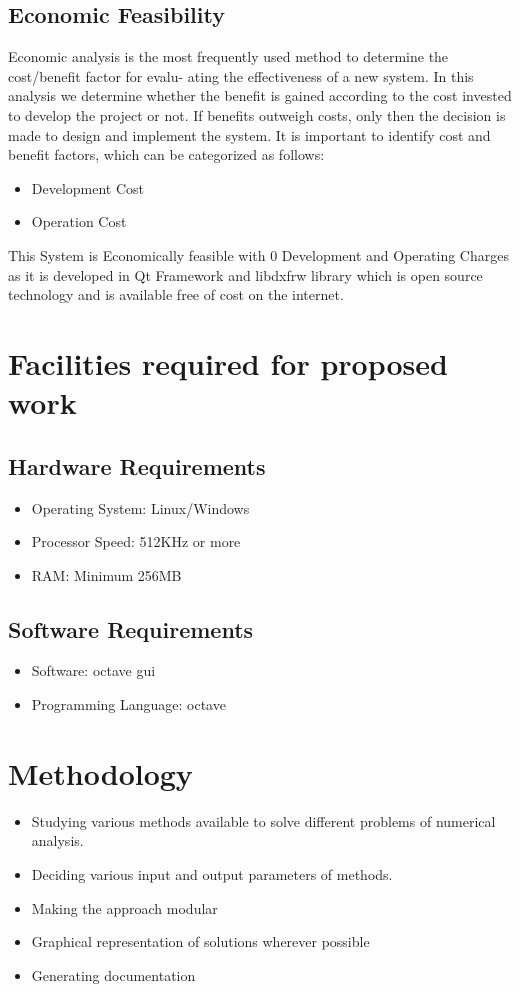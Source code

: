 \subsection{Economic Feasibility}
\noindent Economic analysis is the most frequently used method to determine the cost/benefit factor for evalu-
ating the effectiveness of a new system. In this analysis we determine whether the benefit is gained
according to the cost invested to develop the project or not. If benefits outweigh costs, only then
the decision is made to design and implement the system. It is important to identify cost and benefit
factors, which can be categorized as follows:
\begin{itemize}
\item Development Cost
\item Operation Cost
\end{itemize}
This System is Economically feasible with 0 Development and Operating Charges
as it is developed in Qt Framework and libdxfrw library which is open source technology and is available free of cost on the internet.

\section{Facilities required for proposed work}
\subsection{Hardware Requirements}
\begin{itemize}
\item Operating System: Linux/Windows
\item Processor Speed: 512KHz or more
\item RAM: Minimum 256MB
\end{itemize}
\subsection{Software Requirements}
\begin{itemize}
\item Software: octave gui
\item Programming Language: octave
\end{itemize}

\section{Methodology}
\begin{itemize}
\item Studying various methods available to solve different problems of numerical analysis.
\item Deciding various input and output parameters of methods.
\item Making the approach modular 
\item Graphical representation of solutions wherever possible
\item Generating documentation
\end{itemize}

